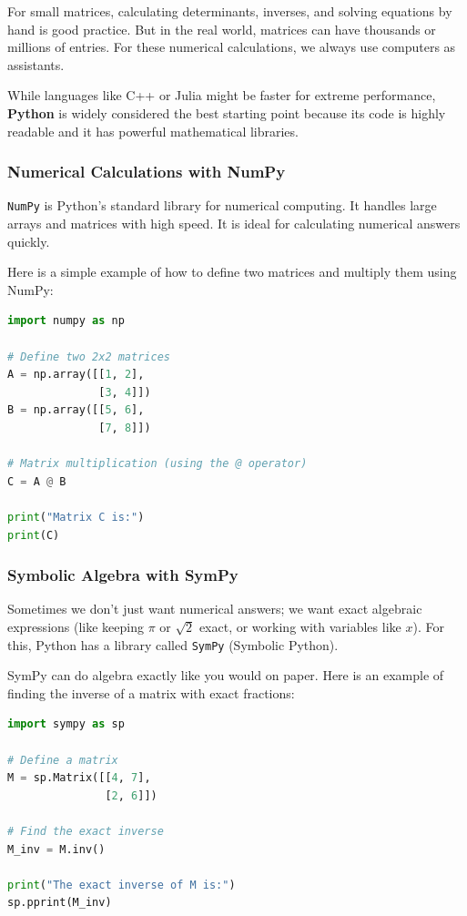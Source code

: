 

For small matrices, calculating determinants, inverses, and solving equations by hand is good practice. But in the real world, matrices can have thousands or millions of entries. For these numerical calculations, we always use computers as assistants. 

While languages like C++ or Julia might be faster for extreme performance, \textbf{Python} is widely considered the best starting point because its code is highly readable and it has powerful mathematical libraries.

\subsubsection*{Numerical Calculations with NumPy}

\texttt{NumPy} is Python's standard library for numerical computing. It handles large arrays and matrices with high speed. It is ideal for calculating numerical answers quickly.

Here is a simple example of how to define two matrices and multiply them using NumPy:

\begin{lstlisting}[language=Python, style=pythonstyle]
import numpy as np

# Define two 2x2 matrices
A = np.array([[1, 2], 
              [3, 4]])
B = np.array([[5, 6], 
              [7, 8]])

# Matrix multiplication (using the @ operator)
C = A @ B

print("Matrix C is:")
print(C)
\end{lstlisting}

\subsubsection*{Symbolic Algebra with SymPy}

Sometimes we don't just want numerical answers; we want exact algebraic expressions (like keeping $\pi$ or $\sqrt{2}$ exact, or working with variables like $x$). For this, Python has a library called \texttt{SymPy} (Symbolic Python). 

SymPy can do algebra exactly like you would on paper. Here is an example of finding the inverse of a matrix with exact fractions:

\begin{lstlisting}[language=Python, style=pythonstyle]
import sympy as sp

# Define a matrix
M = sp.Matrix([[4, 7], 
               [2, 6]])

# Find the exact inverse
M_inv = M.inv()

print("The exact inverse of M is:")
sp.pprint(M_inv)
\end{lstlisting}


